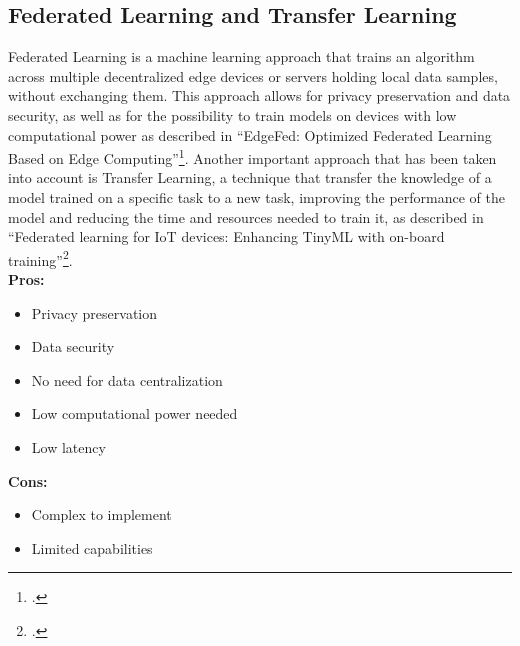 \subsection{Federated Learning and Transfer Learning}
Federated Learning is a machine learning approach that trains an algorithm across multiple decentralized edge devices or servers holding local data samples, without exchanging them. This approach allows for privacy preservation and data security, as well as for the possibility to train models on devices with low computational power as described in \enquote{EdgeFed: Optimized Federated Learning
Based on Edge Computing}\footcite{9260194}.
Another important approach that has been taken into account is Transfer Learning, a technique that transfer the knowledge of a model trained on a specific task to a new task, improving the performance of the model and reducing the time and resources needed to train it, as described in \enquote{Federated learning for IoT devices: Enhancing TinyML with on-board training}\footcite{FICCO2024102189}.\\
\textbf{Pros:}
\begin{itemize}
    \item Privacy preservation
    \item Data security
    \item No need for data centralization
    \item Low computational power needed
    \item Low latency
\end{itemize}
\textbf{Cons:}
\begin{itemize}
    \item Complex to implement
    \item Limited capabilities
\end{itemize}